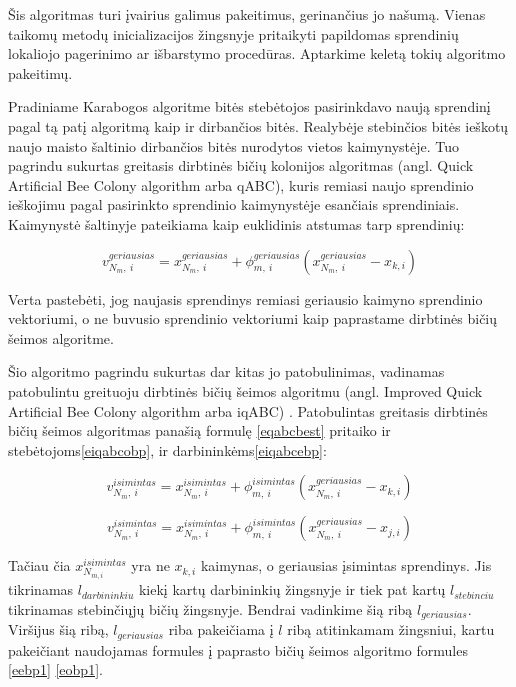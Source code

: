 \documentclass{VUMIFKompMagistrinis}
\begin{document}
Šis algoritmas turi įvairius galimus pakeitimus, gerinančius jo našumą. Vienas taikomų metodų inicializacijos žingsnyje pritaikyti papildomas sprendinių lokaliojo pagerinimo ar išbarstymo procedūras. Aptarkime keletą tokių algoritmo pakeitimų.



Pradiniame Karabogos algoritme \cite{KaB07}  bitės stebėtojos pasirinkdavo naują sprendinį pagal tą patį algoritmą kaip ir dirbančios bitės. Realybėje stebinčios bitės ieškotų naujo maisto šaltinio dirbančios bitės nurodytos vietos kaimynystėje. Tuo pagrindu sukurtas greitasis dirbtinės bičių kolonijos algoritmas \cite{KaG14} (angl. Quick Artificial Bee Colony algorithm arba qABC), kuris remiasi naujo sprendinio ieškojimu pagal pasirinkto sprendinio kaimynystėje esančiais sprendiniais. Kaimynystė šaltinyje pateikiama kaip euklidinis atstumas tarp sprendinių: 

\begin{equation}
\label{eqabcbest}
v_{N_m,\ i}^{geriausias}=x_{N_m,\ i}^{geriausias}+\phi_{m,\ i}^{geriausias}(x_{N_m,\ i}^{geriausias}-x_{k,i} )
\end{equation}

Verta pastebėti, jog naujasis sprendinys remiasi geriausio kaimyno sprendinio vektoriumi, o ne buvusio sprendinio vektoriumi kaip paprastame dirbtinės bičių šeimos algoritme.


Šio algoritmo pagrindu sukurtas dar kitas jo patobulinimas, vadinamas patobulintu greituoju dirbtinės bičių šeimos algoritmu (angl. Improved Quick Artificial Bee Colony algorithm arba iqABC) \cite{ABK19}.
Patobulintas greitasis dirbtinės bičių šeimos algoritmas panašią formulę \eqref{eqabcbest} pritaiko ir stebėtojoms\eqref{eiqabcobp}, ir darbininkėms\eqref{eiqabcebp}:

\begin{equation}\label{eiqabcobp}
v_{N_m,\ i}^{isimintas}=x_{N_m,\ i}^{isimintas}+\phi_{m,\ i}^{isimintas}(x_{N_m,\ i}^{geriausias}-x_{k,i} )
\end{equation}

\begin{equation}\label{eiqabcebp}
v_{N_m,\ i}^{isimintas}=x_{N_m,\ i}^{isimintas}+\phi_{m,\ i}^{isimintas}(x_{N_m,\ i}^{geriausias}-x_{j,i} )
\end{equation}


Tačiau čia $x_{N_{m,i}}^{isimintas}$ yra ne $x_{k,i}$  kaimynas, o geriausias įsimintas sprendinys. Jis tikrinamas $l_{darbininkiu}$ kiekį kartų darbininkių žingsnyje ir tiek pat kartų $l_{stebinciu}$ tikrinamas stebinčiųjų bičių žingsnyje. Bendrai vadinkime šią ribą $l_{geriausias}$. Viršijus šią ribą, $l_{geriausias}$ riba pakeičiama į $l$ ribą atitinkamam žingsniui, kartu pakeičiant naudojamas formules į paprasto bičių šeimos algoritmo formules \eqref{eebp1} \eqref{eobp1}. 
\end{document}

